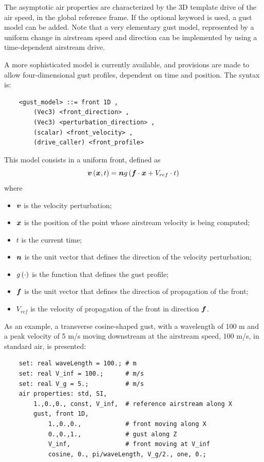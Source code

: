 The asymptotic air properties are characterized by the 3D template drive 
of the air speed, in the global reference frame.
If the optional  keyword is used, a gust model can be added.
Note that a very elementary gust model, represented by a uniform change
in airstream speed and direction can be implemented by using
a time-dependent airstream drive.

A more sophisticated model is currently available, and provisions are
made to allow four-dimensional gust profiles, dependent on time
and position.
The syntax is:
\begin{verbatim}
    <gust_model> ::= front 1D ,
        (Vec3) <front_direction> ,
        (Vec3) <perturbation_direction> ,
        (scalar) <front_velocity> ,
        (drive_caller) <front_profile>
\end{verbatim}
This model consists in a uniform front, defined as
\begin{displaymath}
	\boldsymbol{v}\left( \boldsymbol{x}, t \right) = \boldsymbol{n} g\left( \boldsymbol{f} \cdot \boldsymbol{x} + V_{ref} \cdot t \right)
\end{displaymath}
where
\begin{itemize}
\item $\boldsymbol{v}$ is the velocity perturbation;
\item $\boldsymbol{x}$ is the position of the point whose airstream velocity
is being computed;
\item $t$ is the current time;
\item $\boldsymbol{n}$ is the unit vector  
that defines the direction of the velocity perturbation;
\item $g\left( \cdot \right)$ is the function  
that defines the gust profile;
\item $\boldsymbol{f}$ is the unit vector  
that defines the direction of propagation of the front;
\item $V_{ref}$ is the velocity  
of propagation of the front in direction $\boldsymbol{f}$.
\end{itemize}
As an example, a transverse cosine-shaped gust, with a wavelength of 100 m
and a peak velocity of 5 m/s moving downstream at the airstream speed,
100 m/s, in standard air, is presented:
\begin{verbatim}
    set: real waveLength = 100.; # m
    set: real V_inf = 100.;      # m/s
    set: real V_g = 5.;          # m/s
    air properties: std, SI,
        1.,0.,0., const, V_inf,  # reference airstream along X
        gust, front 1D,
            1.,0.,0.,            # front moving along X
            0.,0.,1.,            # gust along Z
            V_inf,               # front moving at V_inf
            cosine, 0., pi/waveLength, V_g/2., one, 0.;
\end{verbatim}

